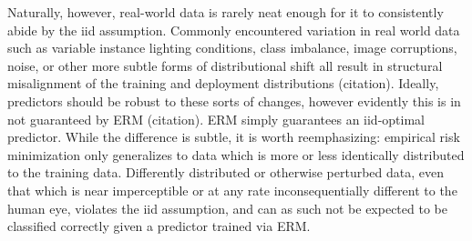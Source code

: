 	Naturally, however, real-world data is rarely neat enough for it to consistently abide by the iid assumption. Commonly encountered variation in real world data such as variable instance lighting conditions, class imbalance, image corruptions, noise, or other more subtle forms of distributional shift all result in structural misalignment of the training and deployment distributions (citation). Ideally, predictors should be robust to these sorts of changes, however evidently this is in not guaranteed by ERM (citation). ERM simply guarantees an iid-optimal predictor. While the difference is subtle, it is worth reemphasizing: empirical risk minimization only generalizes to data which is more or less identically distributed to the training data. Differently distributed or otherwise perturbed data, even that which is near imperceptible or at any rate inconsequentially different to the human eye, violates the iid assumption, and can as such not be expected to be classified correctly given a predictor trained via ERM. 
	
